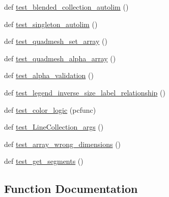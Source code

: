 \begin{DoxyCompactItemize}
\item 
def \hyperlink{namespacematplotlib_1_1tests_1_1test__collections_ae707b3d994e2b0546986d7a49cb1ca40}{test\+\_\+blended\+\_\+collection\+\_\+autolim} ()
\item 
def \hyperlink{namespacematplotlib_1_1tests_1_1test__collections_a4a6a0f8e1d1788115c66fa8ec7ba5637}{test\+\_\+singleton\+\_\+autolim} ()
\item 
def \hyperlink{namespacematplotlib_1_1tests_1_1test__collections_a0a7d8a4bf87b42a1434386d526e86214}{test\+\_\+quadmesh\+\_\+set\+\_\+array} ()
\item 
def \hyperlink{namespacematplotlib_1_1tests_1_1test__collections_a7e5e7626626730f1737f34e50b7b6158}{test\+\_\+quadmesh\+\_\+alpha\+\_\+array} ()
\item 
def \hyperlink{namespacematplotlib_1_1tests_1_1test__collections_a88ff25c36e9228f952cbe044e9be74dc}{test\+\_\+alpha\+\_\+validation} ()
\item 
def \hyperlink{namespacematplotlib_1_1tests_1_1test__collections_a893727420139f5454c50eb9fc49dd951}{test\+\_\+legend\+\_\+inverse\+\_\+size\+\_\+label\+\_\+relationship} ()
\item 
def \hyperlink{namespacematplotlib_1_1tests_1_1test__collections_a80befa98eed3971c462604734356744d}{test\+\_\+color\+\_\+logic} (pcfunc)
\item 
def \hyperlink{namespacematplotlib_1_1tests_1_1test__collections_a32d96136af0da88e030298f157e7c139}{test\+\_\+\+Line\+Collection\+\_\+args} ()
\item 
def \hyperlink{namespacematplotlib_1_1tests_1_1test__collections_a213201f695c7f8a99275a5aa25f6fbe6}{test\+\_\+array\+\_\+wrong\+\_\+dimensions} ()
\item 
def \hyperlink{namespacematplotlib_1_1tests_1_1test__collections_a86dd841fa18ce9dee35b2a5fba236cf4}{test\+\_\+get\+\_\+segments} ()
\end{DoxyCompactItemize}


\subsection{Function Documentation}
\mbox{\label{namespacematplotlib_1_1tests_1_1test__collections_ae367299909e7d8974d152b7e0d56e89b}} 
